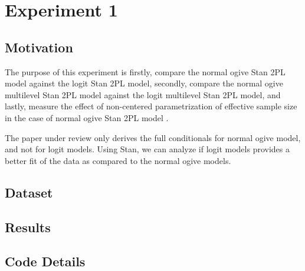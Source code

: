 \documentclass[12pt]{article}
\begin{document}
\section{Experiment 1}
\subsection{Motivation}
The purpose of this experiment is firstly, compare the normal ogive Stan 2PL model against the logit Stan 2PL model, secondly, compare the normal ogive multilevel Stan 2PL model against the logit multilevel Stan 2PL model, and lastly, measure the effect of non-centered parametrization of effective sample size in the case of normal ogive Stan 2PL model \cite{papaspiliopoulos2007general}. 

The paper under review \cite{fox2001bayesian} only derives the full conditionals for normal ogive model, and not for logit models. Using Stan, we can analyze if logit models provides a better fit of the data as compared to the normal ogive models.

\subsection{Dataset}

\subsection{Results}

\subsection{Code Details}







\end{document}
